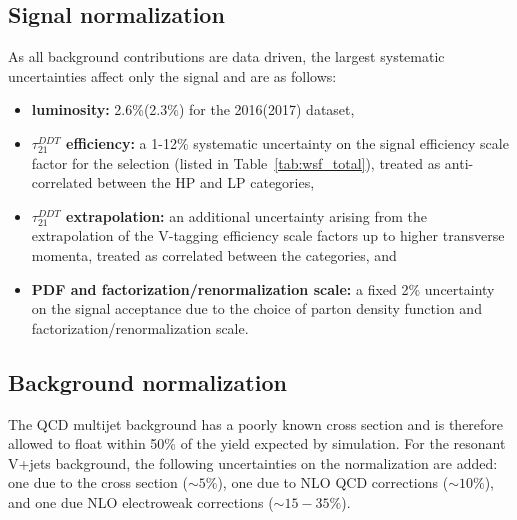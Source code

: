 \subsection{Signal normalization}
As all background contributions are data driven, the largest systematic uncertainties affect only the signal and are as follows:
\begin{itemize}
  \itemsep0em
\item {\bf luminosity: } 2.6\%(2.3\%) for the 2016(2017) dataset,
\item {\bf $\tau_{21}^{DDT}$ efficiency: } a 1-12\% systematic uncertainty on the signal efficiency scale factor for the \ddt selection (listed in Table~\ref{tab:wsf_total}), treated as anti-correlated between the HP and LP categories,
\item {\bf $\tau_{21}^{DDT}$ \PT{} extrapolation: } an additional uncertainty arising from the extrapolation of the V-tagging efficiency scale factors up to higher transverse momenta, treated as correlated between the \ddt categories, and 
\item {\bf PDF and factorization/renormalization scale: } a fixed 2\% uncertainty on the signal acceptance due to the choice of parton density function and factorization/renormalization scale. 
\end{itemize} 


\subsection{Background normalization}
The QCD multijet background has a poorly known cross section and is therefore allowed to float within 50\% of the yield expected by simulation. For the resonant V+jets background, the following uncertainties on the normalization are added: one due to the cross section ($\sim5\%$), one due to NLO QCD corrections ($\sim10\%$), and one due NLO electroweak corrections ($\sim15-35\%$).


